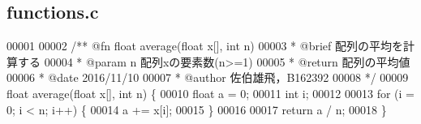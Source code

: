 \subsection{functions.\-c}

\begin{DoxyCode}
00001 \textcolor{comment}{}
00002 \textcolor{comment}{/** @fn float average(float x[], int n)}
00003 \textcolor{comment}{ *  @brief  配列の平均を計算する}
00004 \textcolor{comment}{ *  @param  n 配列xの要素数(n>=1)}
00005 \textcolor{comment}{ *  @return 配列の平均値}
00006 \textcolor{comment}{ *  @date   2016/11/10}
00007 \textcolor{comment}{ *  @author 佐伯雄飛，B162392}
00008 \textcolor{comment}{ */}
00009 \textcolor{keywordtype}{float} average(\textcolor{keywordtype}{float} x[], \textcolor{keywordtype}{int} n) \{
00010   \textcolor{keywordtype}{float} a = 0;
00011   \textcolor{keywordtype}{int} i;
00012 
00013   \textcolor{keywordflow}{for} (i = 0; i < n; i++) \{
00014     a += x[i];
00015   \}
00016 
00017   \textcolor{keywordflow}{return} a / n;
00018 \}
\end{DoxyCode}
